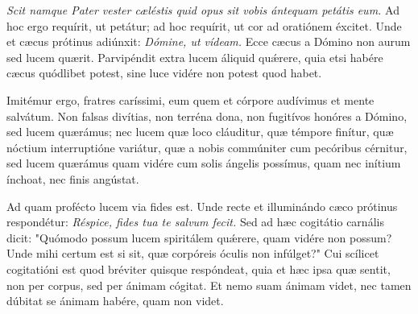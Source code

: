{\noindent \emph{Scit namque Pater vester cæléstis quid opus sit vobis ántequam petátis eum.} Ad hoc ergo requírit, ut petátur; ad hoc requírit, ut cor ad oratiónem éxcitet. Unde et cæcus prótinus adiúnxit: \emph{Dómine, ut vídeam.} Ecce cæcus a Dómino non aurum sed lucem quærit. Parvipéndit extra lucem áliquid qu\'{æ}rere, quia etsi habére cæcus quódlibet potest, sine luce vidére non potest quod habet.

\noindent Imitémur ergo, fratres caríssimi, eum quem et córpore audívimus et mente salvátum. Non falsas divítias, non terréna dona, non fugitívos honóres a Dómino, sed lucem quærámus; nec lucem quæ loco cláuditur, quæ témpore finítur, quæ nóctium interruptióne variátur, quæ a nobis commúniter cum pecóribus cérnitur, sed lucem quærámus quam vidére cum solis ángelis possímus, quam nec inítium ínchoat, nec finis angústat.

\noindent Ad quam profécto lucem via fides est. Unde recte et illuminándo cæco prótinus respondétur: \emph{Réspice, fides tua te salvum fecit.} Sed ad hæc cogitátio carnális dicit: "Quómodo possum lucem spiritálem qu\'{æ}rere, quam vidére non possum? Unde mihi certum est si sit, quæ corpóreis óculis non infúlget?" Cui scílicet cogitatióni est quod bréviter quisque respóndeat, quia et hæc ipsa quæ sentit, non per corpus, sed per ánimam cógitat. Et nemo suam ánimam videt, nec tamen dúbitat se ánimam habére, quam non videt.

\vfill
\pagebreak

 

\vspace{-5mm}


\vfill
\pagebreak
}
\newcommand{\benedictus}{\pars{Canticum Zachariæ.} \scriptura{Lc. 18, 39.41; Cf. Mc. 10, 47.51; \textbf{H142}}

\vspace{-4mm}

\antiphona{VIII G}{temporalia/ant-misereremeifilidavid.gtex}

\vspace{-2mm}

\scriptura{Lc. 1, 68-79}

\vspace{-2mm}

\cantusSineNeumas
\initiumpsalmi{temporalia/benedictus-initium-viiisoll-g-auto.gtex}


 \Abardot{}}


